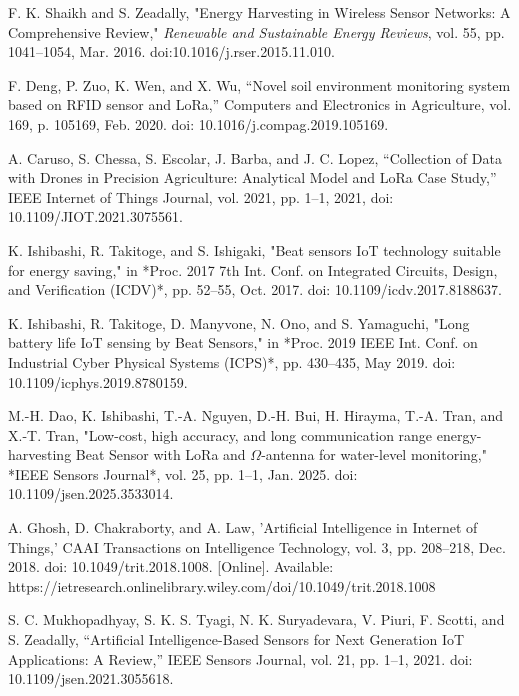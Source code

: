 \documentclass[conference]{IEEEtran}
\begin{document}
\begin{thebibliography}{00}
F. K. Shaikh and S. Zeadally, "Energy Harvesting in Wireless Sensor Networks: A Comprehensive Review," \emph{Renewable and Sustainable Energy Reviews}, vol. 55, pp. 1041--1054, Mar. 2016. doi:10.1016/j.rser.2015.11.010.

 F. Deng, P. Zuo, K. Wen, and X. Wu, 
``Novel soil environment monitoring system based on RFID sensor and LoRa,'' 
Computers and Electronics in Agriculture, vol. 169, p. 105169, Feb. 2020. doi: 10.1016/j.compag.2019.105169.

 A. Caruso, S. Chessa, S. Escolar, J. Barba, and J. C. Lopez, “Collection of Data with Drones in Precision Agriculture: Analytical Model and LoRa Case Study,” IEEE Internet of Things Journal, vol. 2021, pp. 1–1, 2021, doi: 10.1109/JIOT.2021.3075561.

K. Ishibashi, R. Takitoge, and S. Ishigaki, 
"Beat sensors IoT technology suitable for energy saving," 
in *Proc. 2017 7th Int. Conf. on Integrated Circuits, Design, and Verification (ICDV)*, pp. 52--55, Oct. 2017. doi: 10.1109/icdv.2017.8188637.

K. Ishibashi, R. Takitoge, D. Manyvone, N. Ono, and S. Yamaguchi, 
"Long battery life IoT sensing by Beat Sensors," 
in *Proc. 2019 IEEE Int. Conf. on Industrial Cyber Physical Systems (ICPS)*, pp. 430--435, May 2019. doi: 10.1109/icphys.2019.8780159.

M.-H. Dao, K. Ishibashi, T.-A. Nguyen, D.-H. Bui, H. Hirayma, T.-A. Tran, and X.-T. Tran, 
"Low-cost, high accuracy, and long communication range energy-harvesting Beat Sensor with LoRa and $\Omega$-antenna for water-level monitoring,"
*IEEE Sensors Journal*, vol. 25, pp. 1--1, Jan. 2025. doi: 10.1109/jsen.2025.3533014.

 A. Ghosh, D. Chakraborty, and A. Law, 
'Artificial Intelligence in Internet of Things,' 
CAAI Transactions on Intelligence Technology, vol. 3, pp. 208--218, Dec. 2018. doi: 10.1049/trit.2018.1008. [Online]. Available: https://ietresearch.onlinelibrary.wiley.com/doi/10.1049/trit.2018.1008

 S. C. Mukhopadhyay, S. K. S. Tyagi, N. K. Suryadevara, V. Piuri, F. Scotti, and S. Zeadally, 
``Artificial Intelligence-Based Sensors for Next Generation IoT Applications: A Review,'' 
IEEE Sensors Journal, vol. 21, pp. 1--1, 2021. doi: 10.1109/jsen.2021.3055618.


\end{thebibliography}
\end{document}
